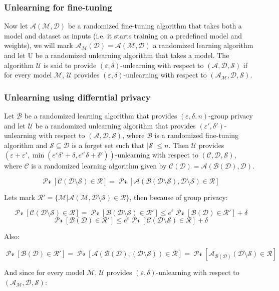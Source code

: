 \documentclass{article}
\begin{document}
\subsubsection{Unlearning for fine-tuning}

Now let $\mathcal{A(M, D)}$ be a randomized fine-tuning algorithm that takes both a model and dataset as inputs (i.e. it starts training on a predefined model and weights), we will mark $\mathcal{A_M(D) = A(M, D)}$ a randomized learning algorithm and let U be a randomized unlearning algorithm that takes a model. The algorithm $\mathcal{U}$ is said to provide $(\varepsilon, \delta)$-unlearning with respect to $\mathcal{(A, D, S)}$ if for every model $\mathcal{M}$, $\mathcal{U}$ provides $(\varepsilon, \delta)$-unlearning with respect to $\mathcal{(A_M, D, S)}$.

\subsubsection{Unlearning using differntial privacy}

Let $\mathcal{B}$ be a randomized learning algorithm that provides $(\varepsilon, \delta, n)$-group privacy and let $\mathcal{U}$ be a randomized unlearning algorithm that provides $(\varepsilon', \delta')$-unlearning with respect to $\mathcal{(A, D, S)}$, where $\mathcal{B}$ is a randomized fine-tuning algorithm and $\mathcal{S \subseteq D}$ is a forget set such that $|\mathcal{S}| \leq n$.
Then $\mathcal{U}$ provides $(\varepsilon + \varepsilon', \min(e^\varepsilon \delta' + \delta, e^{\varepsilon'} \delta + \delta'))$-unlearning with respect to $\mathcal{(C, D, S)}$, where $\mathcal{C}$ is a randomized learning algorithm given by $\mathcal{C(D) = A(B(D), D)}$.

\[ \mathcal{\Pr[C(D \setminus S) \in R]} = \mathcal{\Pr[A(B(D \setminus S), D \setminus S) \in R]}\]

Lets mark $\mathcal{R' = \{M | A(M, D \setminus S) \in R\}}$, then because of group privacy:

\[ \mathcal{\Pr[C(D \setminus S) \in R]} = \mathcal{\Pr[B(D \setminus S) \in R']} \leq e^\varepsilon \mathcal{\Pr[B(D) \in R']} + \delta\]
\[ \mathcal{\Pr[B(D) \in R']} \leq e^\varepsilon \mathcal{\Pr[C(D \setminus S) \in R]} + \delta\]

Also:

\[ \mathcal{\Pr[B(D) \in R']} = \mathcal{\Pr[A(B(D), (D \setminus S)) \in R]} = \mathcal{\Pr[A_{B(D)}(D \setminus S) \in R]}\]

And since for every model $\mathcal{M}$, $\mathcal{U}$ provides $(\varepsilon, \delta)$-unlearning with respect to $\mathcal{(A_M, D, S)}$:
\end{document}
